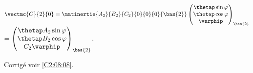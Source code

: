 $\vectmc{C}{2}{0} = \matinertie{A_2}{B_2}{C_2}{0}{0}{0}{\bas{2}} 
 \begin{pmatrix} 
 \thetap \sin\varphi  \\
  \thetap \cos\varphi  \\
  \varphip
 \end{pmatrix}_{\bas{2}}$
 $ =  \begin{pmatrix} 
 \thetap A_2 \sin\varphi  \\
  \thetap B_2 \cos\varphi  \\
  C_ 2 \varphip
 \end{pmatrix}_{\bas{2}}$.
%  
%  


\else
\fi

\ifprof


\else
\fi

\ifprof
\else
\begin{flushright}
\footnotesize{Corrigé  voir \ref{C2:08:08}.}
\end{flushright}%
\fi